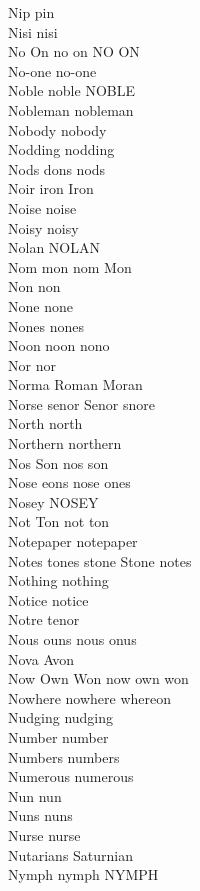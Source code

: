 Nip pin\\
Nisi nisi\\
No On no on NO ON\\
No-one no-one\\
Noble noble NOBLE\\
Nobleman nobleman\\
Nobody nobody\\
Nodding nodding\\
Nods dons nods\\
Noir iron Iron\\
Noise noise\\
Noisy noisy\\
Nolan NOLAN\\
Nom mon nom Mon\\
Non non\\
None none\\
Nones nones\\
Noon noon nono\\
Nor nor\\
Norma Roman Moran\\
Norse senor Senor snore\\
North north\\
Northern northern\\
Nos Son nos son\\
Nose eons nose ones\\
Nosey NOSEY\\
Not Ton not ton\\
Notepaper notepaper\\
Notes tones stone Stone notes\\
Nothing nothing\\
Notice notice\\
Notre tenor\\
Nous ouns nous onus\\
Nova Avon\\
Now Own Won now own won\\
Nowhere nowhere whereon\\
Nudging nudging\\
Number number\\
Numbers numbers\\
Numerous numerous\\
Nun nun\\
Nuns nuns\\
Nurse nurse\\
Nutarians Saturnian\\
Nymph nymph NYMPH\\


